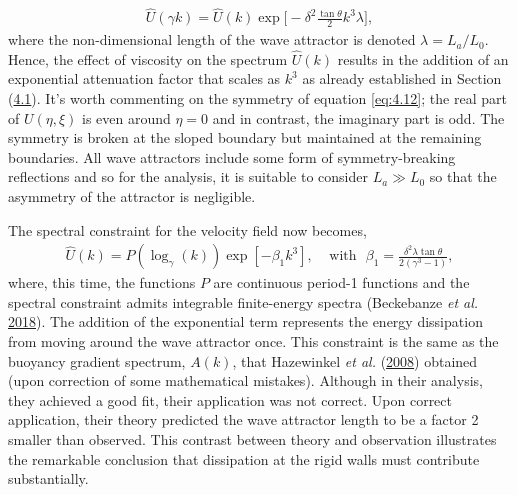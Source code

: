 \documentclass[a4paper]{article}
\numberwithin{equation}{section}
\begin{document}
\begin{align}\label{eq:4.13}
\hat{U}(\gamma k) = \hat{U}(k)\exp\bigg[-\delta^2 \frac{\tan\theta}{2}k^3\lambda \bigg],
\end{align}
where the non-dimensional length of the wave attractor is denoted $\lambda = L_a/L_0$. Hence, the effect of viscosity on the spectrum $\hat{U}(k)$ results in the addition of an exponential attenuation factor that scales as $k^3$ as already established in Section (\hyperref[sec:4.1]{4.1}). It's worth commenting on the symmetry of equation \eqref{eq:4.12}; the real part of $U(\eta, \xi)$ is even around $\eta = 0$ and in contrast, the imaginary part is odd. The symmetry is broken at the sloped boundary but maintained at the remaining boundaries. All wave attractors include some form of symmetry-breaking reflections and so for the analysis, it is suitable to consider $L_a \gg L_0$ so that the asymmetry of the attractor is negligible. 

The spectral constraint for the velocity field now becomes, 
\begin{align}\label{eq:4.14}
\hat{U}(k) = P(\log_\gamma(k))\exp[-\beta_1 k^3], ~~~~~ \text{with}~~~\beta_1 = \frac{\delta^2\lambda\tan\theta}{2(\gamma^3 - 1)},
\end{align}
where, this time, the functions $P$ are continuous period-1 functions and the spectral constraint admits integrable finite-energy spectra (Beckebanze \emph{et al.} \hyperlink{ref 8}{2018}). The addition of the exponential term represents the energy dissipation from moving around the wave attractor once. This constraint is the same as the buoyancy gradient spectrum, $A(k)$, that Hazewinkel \emph{et al.}  (\hyperlink{ref 27}{2008}) obtained (upon correction of some mathematical mistakes). Although in their analysis, they achieved a good fit, their application was not correct. Upon correct application, their theory predicted the wave attractor length to be a factor 2 smaller than observed. This contrast between theory and observation illustrates the remarkable conclusion that dissipation at the rigid walls must contribute substantially.
\end{document}
